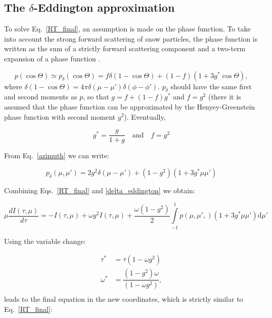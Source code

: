 \documentclass[a4paper,11pt]{article}
\begin{document}
\subsection{The $\delta$-Eddington approximation}

To solve Eq.~\ref{RT_final}, an assumption is made on the phase function. To take into account the strong forward scattering of snow particles, the phase function is written as the sum of a strictly forward scattering component and a two-term expansion of a phase function \citep{joseph_delta-eddington_1976}.

\begin{equation}
p(\cos\Theta) \simeq p_\delta(\cos\Theta)=f\delta(1-\cos\Theta)+(1-f)(1+3g^*\cos\Theta),
\end{equation}
where $\delta(1-\cos\Theta)=4\pi\delta(\mu-\mu')\delta(\phi-\phi')$.
$p_\delta$ should have the same first and second moments as $p$, so that $g=f+(1-f)g^*$ and $f=g^2$ (there it is assumed that the phase function can be approximated by the Henyey-Greenstein phase function with second moment $g^2$). Eventually,

\begin{equation}
g^*=\dfrac{g}{1+g} \quad \textrm{and} \quad f=g^2
\end{equation}

\noindent From Eq.~\ref{azimuth} we can write:

\begin{equation}
p_\delta(\mu,\mu') =2g^2\delta(\mu-\mu')+(1-g^2)(1+3g^*\mu\mu') 
\label{delta_eddington}
\end{equation}

\noindent Combining Eqs.~\ref{RT_final} and \ref{delta_eddington} we obtain:

\begin{equation}
\mu\dfrac{dI(\tau,\mu)}{d\tau}=- I(\tau,\mu)+\omega g^2 I(\tau,\mu)+\dfrac{\omega(1-g^2)}{2}\displaystyle\int\limits_{-1}^{1}p(\mu,\mu',)(1+3g^*\mu\mu') \mathrm{d} \mu' 
\end{equation}

\noindent Using the variable change:

\begin{align}
\tau^* & =\tau(1-\omega g^2) \\
\omega^* & =\dfrac{(1-g^2)\omega}{(1-\omega g^2)}, \\
\end{align}
leads to the final equation in the new coordinates, which is strictly similar to Eq.~\ref{RT_final}:
 
\end{document}
